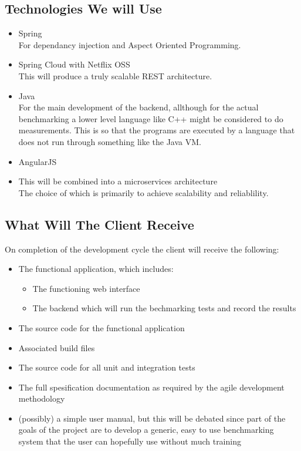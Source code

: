 \subsection{Technologies We will Use}
\begin{itemize}
	\item Spring\\
	For dependancy injection and Aspect Oriented Programming.
	\item Spring Cloud with Netflix OSS\\
	This will produce a truly scalable REST architecture.
	\item Java\\
	For the main development of the backend, allthough for the actual benchmarking a lower level language like C++ might be considered to do measurements. This is so that the programs are executed by a language that does not run through something like the Java VM.
	\item AngularJS
	\item This will be combined into a microservices architecture\\
	The choice of which is primarily to achieve scalability and reliablility.
\end{itemize} 

\subsection{What Will The Client Receive}
On completion of the development cycle the client will receive the following:
\begin{itemize}
	\item The functional application, which includes:
	\begin{itemize}
		\item The functioning web interface
		\item The backend which will run the bechmarking tests and record the results
	\end{itemize}
	\item The source code for the functional application
	\item Associated build files
	\item The source code for all unit and integration tests
	\item The full spesification documentation as required by the agile development methodology
	\item (possibly) a simple user manual, but this will be debated since part of the goals of the project are to develop a generic, easy to use benchmarking system that the user can hopefully use without much training
\end{itemize}
